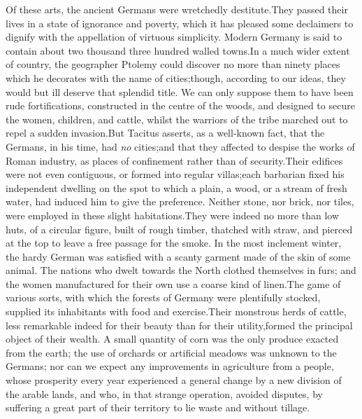 Of these arts, the ancient Germans were wretchedly destitute.\footnotemark[1601]
They passed their lives in a state of ignorance and poverty,
which it has pleased some declaimers to dignify with the
appellation of virtuous simplicity. Modern Germany is said to
contain about two thousand three hundred walled towns.\footnotemark[17] In a
much wider extent of country, the geographer Ptolemy could
discover no more than ninety places which he decorates with the
name of cities;\footnotemark[18] though, according to our ideas, they would but
ill deserve that splendid title. We can only suppose them to have
been rude fortifications, constructed in the centre of the woods,
and designed to secure the women, children, and cattle, whilst
the warriors of the tribe marched out to repel a sudden invasion.\footnotemark[19]
But Tacitus asserts, as a well-known fact, that the Germans,
in his time, had \textit{no} cities;\footnotemark[20] and that they affected to
despise the works of Roman industry, as places of confinement
rather than of security.\footnotemark[21] Their edifices were not even
contiguous, or formed into regular villas;\footnotemark[22] each barbarian
fixed his independent dwelling on the spot to which a plain, a
wood, or a stream of fresh water, had induced him to give the
preference. Neither stone, nor brick, nor tiles, were employed in
these slight habitations.\footnotemark[23] They were indeed no more than low
huts, of a circular figure, built of rough timber, thatched with
straw, and pierced at the top to leave a free passage for the
smoke. In the most inclement winter, the hardy German was
satisfied with a scanty garment made of the skin of some animal.
The nations who dwelt towards the North clothed themselves in
furs; and the women manufactured for their own use a coarse kind
of linen.\footnotemark[24] The game of various sorts, with which the forests of
Germany were plentifully stocked, supplied its inhabitants with
food and exercise.\footnotemark[25] Their monstrous herds of cattle, less
remarkable indeed for their beauty than for their utility,\footnotemark[26]
formed the principal object of their wealth. A small quantity of
corn was the only produce exacted from the earth; the use of
orchards or artificial meadows was unknown to the Germans; nor
can we expect any improvements in agriculture from a people,
whose prosperity every year experienced a general change by a new
division of the arable lands, and who, in that strange operation,
avoided disputes, by suffering a great part of their territory to
lie waste and without tillage.\footnotemark[27]

